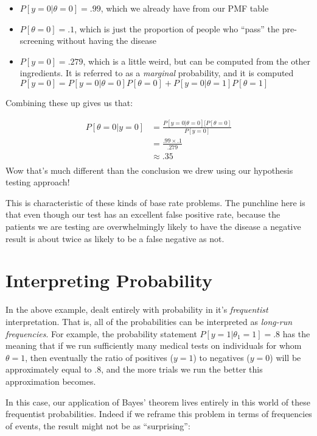 \documentclass[
]{article}
\providecommand{\tightlist}{%
  \setlength{\itemsep}{0pt}\setlength{\parskip}{0pt}}
\begin{document}
\begin{itemize}
\tightlist
\item
  \(P[y=0|\theta=0]=.99\), which we already have from our PMF table
\item
  \(P[\theta=0]=.1\), which is just the proportion of people who
  ``pass'' the pre-screening without having the disease
\item
  \(P[y=0]=.279\), which is a little weird, but can be computed from the
  other ingredients. It is referred to as a \emph{marginal} probability,
  and it is computed
  \(P[y=0] = P[y=0|\theta=0]P[\theta=0] + P[y=0|\theta=1]P[\theta=1]\)
\end{itemize}

Combining these up gives us that:

\[
\begin{split}
P[\theta=0|y=0] &= \frac{P[y=0|\theta=0][P[\theta=0]}{P[y=0]}\\
&= \frac{.99\times.1}{.279}\\
&\approx .35\\
\end{split}
\] Wow that's much different than the conclusion we drew using our
hypothesis testing approach!

This is characteristic of these kinds of base rate problems. The
punchline here is that even though our test has an excellent false
positive rate, because the patients we are testing are overwhelmingly
likely to have the disease a negative result is about twice as likely to
be a false negative as not.

\hypertarget{interpreting-probability}{%
\section{Interpreting Probability}\label{interpreting-probability}}

In the above example, dealt entirely with probability in it's
\emph{frequentist} interpretation. That is, all of the probabilities can
be interpreted as \emph{long-run frequencies}. For example, the
probability statement \(P[y=1|\theta_1=1] = .8\) has the meaning that if
we run sufficiently many medical tests on individuals for whom
\(\theta=1\), then eventually the ratio of positives (\(y=1\)) to
negatives (\(y=0\)) will be approximately equal to \(.8\), and the more
trials we run the better this approximation becomes.

In this case, our application of Bayes' theorem lives entirely in this
world of these frequentist probabilities. Indeed if we reframe this
problem in terms of frequencies of events, the result might not be as
``surprising'':
\end{document}
